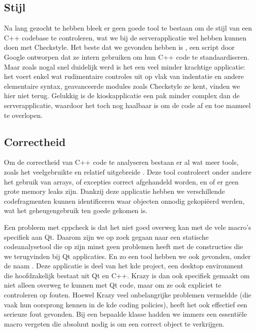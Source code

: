 \subsection{Stijl}
\label{kiosk:realisatie:codeanalyse:stijl}

Na lang gezocht te hebben bleek er geen goede tool te bestaan om de stijl van een C++ codebase te controleren, wat we bij de serverapplicatie wel hebben kunnen doen met Checkstyle. Het beste dat we gevonden hebben is , een script door Google ontworpen dat ze intern gebruiken om hun C++ code te standaardiseren. Maar zoals nogal snel duidelijk werd is het een veel minder krachtige applicatie: het voert enkel wat rudimentaire controles uit op vlak van indentatie en andere elementaire syntax, geavanceerde modules zoals Checkstyle ze kent, vinden we hier niet terug. Gelukkig is de kioskapplicatie een pak minder complex dan de serverapplicatie, waardoor het toch nog haalbaar is om de code af en toe manueel te overlopen.

\subsection{Correctheid}
\label{kiosk:realisatie:codeanalyse:correctheid}

Om de correctheid van C++ code te analyseren bestaan er al wat meer tools, zoals het veelgebruikte en relatief uitgebreide . Deze tool controleert onder andere het gebruik van arrays, of excepties correct afgehandeld worden, en of er geen grote memory leaks zijn. Dankzij deze applicatie hebben we verschillende codefragmenten kunnen identificeren waar objecten onnodig gekopiëerd werden, wat het geheugengebruik ten goede gekomen is.

Een probleem met cppcheck is dat het niet goed overweg kan met de vele macro's specifiek aan Qt. Daarom zijn we op zoek gegaan naar een statische codeanalysetool die op zijn minst geen problemen heeft met de constructies die we terugvinden bij Qt applicaties. En zo een tool hebben we ook gevonden, onder de naam . Deze applicatie is deel van het \ac{kde} project, een desktop environment die hoofdzakelijk bestaat uit Qt en C++. Krazy is dan ook specifiek gemaakt om niet alleen overweg te kunnen met Qt code, maar om ze ook expliciet te controleren op fouten. Hoewel Krazy veel onbelangrijke problemen vermeldde (die vaak hun oorsprong kennen in de \ac{kde} coding policies), heeft het ook effectief een serieuze fout gevonden. Bij een bepaalde klasse hadden we immers een essentiële macro vergeten die absoluut nodig is om een correct object te verkrijgen.

